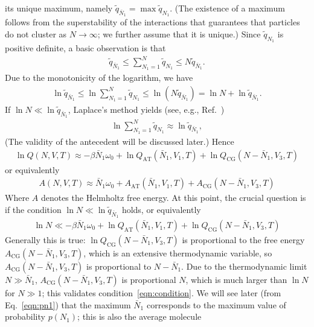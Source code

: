 \documentclass[aip,jcp,a4paper,reprint,onecolumn]{revtex4-1}
\newcommand{\AT}{{\textrm{{AT}}}}
\newcommand{\CG}{{\textrm{CG}}}
\begin{document}
its unique maximum, namely $\tilde q_{\bar N_1} = \max \tilde q_{N_1}$. (The existence of a maximum follows from the superstability of the interactions that guarantees that particles do not cluster as $N\to\infty$; we further assume that it is unique.) Since $\tilde q_{N_1}$ is positive definite, a basic
observation is that
\begin{align}
  \tilde q_{\bar N_1}
  \leq
  \sum_{N_1=1}^N \tilde q_{N_1}
  \leq
  N \tilde q_{\bar N_1}. 
\end{align}
Due to the monotonicity of the logarithm, we have
\begin{align}
  \ln\tilde q_{\bar N_1}
  \leq
  \ln\sum_{N_1=1}^N \tilde q_{N_1}
  \leq
  \ln (N \tilde q_{\bar N_1})
  =
  \ln N + \ln\tilde q_{\bar N_1}.
\end{align}
If $\ln N \ll \ln \tilde q_{\bar N_1}$, Laplace's method yields (see, e.g., Ref.~) 
\begin{align}
  \ln\sum_{N_1=1}^N \tilde q_{N_1}
  \approx
  \ln\tilde q_{\bar N_1},
\end{align}
(The validity of the antecedent will be discussed later.) Hence
\begin{align}
  \ln Q(N, V, T)
  \approx
  -\beta \bar N_1\omega_0 + 
  \ln Q_{\AT}(\bar N_1, V_1, T) + \ln Q_{\CG}(N - \bar N_1, V_3, T)
\end{align}
or equivalently
\begin{align}\label{eqn:a-energy-1}
  A(N, V, T)
  \approx
  \bar N_1\omega_0 +
  A_{\AT}(\bar N_1, V_1, T) + A_{\CG}(N - \bar N_1, V_3, T)
\end{align}
Where $A$ denotes the Helmholtz free energy. 
At this point, the crucial question is if the condition $\ln N \ll \ln \tilde q_{\bar N_1}$
holds, or equivalently
\begin{align}\label{eqn:condition}
  \ln N 
  \ll
  -\beta \bar N_1\omega_0 +
  \ln Q_{\AT}(\bar N_1, V_1, T) + \ln Q_{\CG}(N - \bar N_1, V_3, T)
\end{align}
Generally this is true: $\ln Q_{\CG}(N - \bar N_1, V_3, T)$
is proportional to the free energy $A_{\CG}(N - \bar N_1, V_3, T)$,
which is an extensive thermodynamic variable, so
$A_{\CG}(N - \bar N_1, V_3, T)$ is proportional to $N-\bar N_1$.
Due to the thermodynamic limit $N \gg \bar N_1$,
$A_{\CG}(N - \bar N_1, V_3, T)$ is proportional $N$, which
is much larger than $\ln N$ for $N\gg 1$; this
validates condition~\eqref{eqn:condition}.
We will see later (from Eq.~\eqref{eqn:pn1})
that the maximum $\bar N_1$ corresponds to the maximum
value of probability $p(N_1)$; this is also the average molecule
\end{document}
